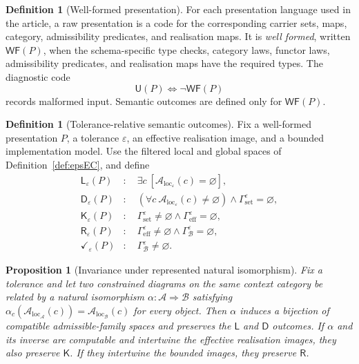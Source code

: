 \documentclass[11pt]{article}
\theoremstyle{plain}
\newtheorem{proposition}[theorem]{Proposition}
\theoremstyle{definition}
\newtheorem{definition}[theorem]{Definition}
\theoremstyle{remark}
\newcommand{\LocalAdm}{\mathcal{A}_{\mathrm{loc}}}
\newcommand{\eps}{\varepsilon}
\begin{document}
\begin{definition}[Well-formed presentation]\label{def:levels}
For each presentation language used in the article, a raw presentation is a code for the
corresponding carrier sets, maps, category, admissibility predicates, and
realisation maps. It is \emph{well formed}, written $\mathsf{WF}(P)$, when the
schema-specific type checks, category laws, functor laws, admissibility
predicates, and realisation maps have the required types. The diagnostic code
\[
\mathsf U(P)\iff\neg\mathsf{WF}(P)
\]
records malformed input. Semantic outcomes are defined only for
$\mathsf{WF}(P)$.
\end{definition}

\begin{definition}[Tolerance-relative semantic outcomes]\label{def:first}
Fix a well-formed presentation $P$, a tolerance $\eps$, an effective
realisation image, and a bounded implementation model. Use the filtered local
and global spaces of Definition~\ref{def:epsEC}, and define
\begin{align*}
\mathsf L_\eps(P)&:\quad
 \exists c\ [\LocalAdm_\eps(c)=\varnothing],\\
\mathsf D_\eps(P)&:\quad
 (\forall c\ \LocalAdm_\eps(c)\ne\varnothing)
 \land\Gamma_{\mathrm{set}}^\eps=\varnothing,\\
\mathsf K_\eps(P)&:\quad
 \Gamma_{\mathrm{set}}^\eps\ne\varnothing
 \land\Gamma_{\mathrm{eff}}^\eps=\varnothing,\\
\mathsf R_\eps(P)&:\quad
 \Gamma_{\mathrm{eff}}^\eps\ne\varnothing
 \land\Gamma_{\mathcal B}^\eps=\varnothing,\\
\checkmark_\eps(P)&:\quad
 \Gamma_{\mathcal B}^\eps\ne\varnothing.
\end{align*}
\end{definition}

\begin{proposition}[Invariance under represented natural isomorphism]
\label{prop:presentation-invariance}
Fix a tolerance and let two constrained diagrams on the same context category
be related by a natural isomorphism $\alpha:\mathcal A\Rightarrow\mathcal B$ satisfying
$\alpha_c(\LocalAdm_{\mathcal A}(c))=
\LocalAdm_{\mathcal B}(c)$ for every object. Then $\alpha$ induces a bijection
of compatible admissible-family spaces and preserves the $\mathsf L$ and
$\mathsf D$ outcomes. If $\alpha$ and its inverse are computable and intertwine
the effective realisation images, they also preserve $\mathsf K$. If they
intertwine the bounded images, they preserve $\mathsf R$.
\end{proposition}
\end{document}

